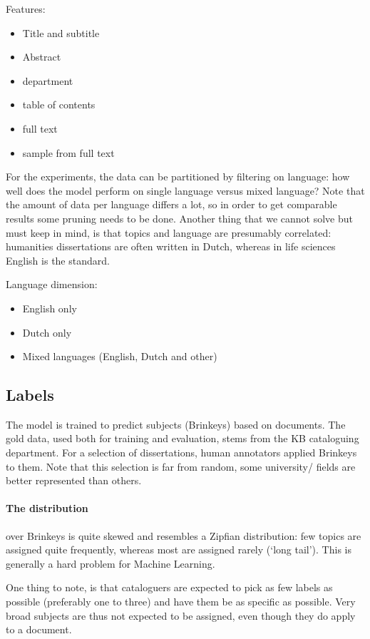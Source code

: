 \documentclass{article}
\begin{document}
Features:\begin{itemize}
\item Title and subtitle
\item Abstract
\item department
\item table of contents
\item full text
\item sample from full text
\end{itemize}

For the experiments, the data can be partitioned by filtering on language: how well does the model perform on single language versus mixed language? Note that the amount of data per language differs a lot, so in order to get comparable results some pruning needs to be done. Another thing that we cannot solve but must keep in mind, is that topics and language are presumably correlated: humanities dissertations are often written in Dutch, whereas in life sciences English is the standard. 

Language dimension:\begin{itemize}
\item English only
\item Dutch only
\item Mixed languages (English, Dutch and other)
\end{itemize}

\subsection{Labels}
The model is trained to predict subjects (Brinkeys) based on documents. The gold data, used both for training and evaluation, stems from the KB cataloguing department. For a selection of dissertations, human annotators applied Brinkeys to them. Note that this selection is far from random, some university/ fields are better represented than others.  

\paragraph{The distribution} over Brinkeys is quite skewed and resembles a Zipfian distribution: few topics are assigned quite frequently, whereas most are assigned rarely (`long tail'). This is generally a hard problem for Machine Learning. 

One thing to note, is that cataloguers are expected to pick as few labels as possible (preferably one to three) and have them be as specific as possible. Very broad subjects are thus not expected to be assigned, even though they do apply to a document.
\end{document}
